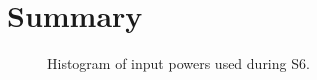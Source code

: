\chapter{Summary}




\begin{figure}
\begin{centering}
\caption[Histogram of input powers used during S6]{Histogram of input
  powers used during S6.}
\label{fig:}
\end{centering}
\end{figure}



